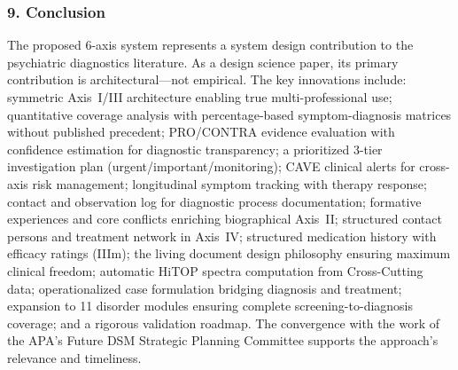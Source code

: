 \documentclass[11pt,a4paper]{article}
\begin{document}
\subsubsection*{9. Conclusion}

The proposed 6-axis system represents a system design contribution to the psychiatric diagnostics literature. As a design science paper, its primary contribution is architectural---not empirical. The key innovations include: symmetric Axis~I/III architecture enabling true multi-professional use; quantitative coverage analysis with percentage-based symptom-diagnosis matrices without published precedent; PRO/CONTRA evidence evaluation with confidence estimation for diagnostic transparency; a prioritized 3-tier investigation plan (urgent/important/monitoring); CAVE clinical alerts for cross-axis risk management; longitudinal symptom tracking with therapy response; contact and observation log for diagnostic process documentation; formative experiences and core conflicts enriching biographical Axis~II; structured contact persons and treatment network in Axis~IV; structured medication history with efficacy ratings (IIIm); the living document design philosophy ensuring maximum clinical freedom; automatic HiTOP spectra computation from Cross-Cutting data; operationalized case formulation bridging diagnosis and treatment; expansion to 11 disorder modules ensuring complete screening-to-diagnosis coverage; and a rigorous validation roadmap. The convergence with the work of the APA's Future DSM Strategic Planning Committee \citep{ErlichFirst2025} supports the approach's relevance and timeliness.


\newpage

\end{document}
